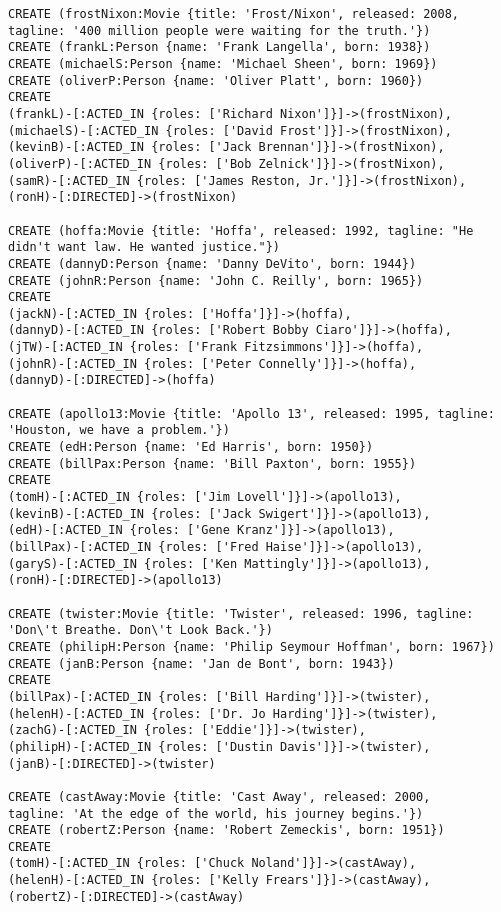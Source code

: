\begin{lstlisting}
CREATE (frostNixon:Movie {title: 'Frost/Nixon', released: 2008,
tagline: '400 million people were waiting for the truth.'})
CREATE (frankL:Person {name: 'Frank Langella', born: 1938})
CREATE (michaelS:Person {name: 'Michael Sheen', born: 1969})
CREATE (oliverP:Person {name: 'Oliver Platt', born: 1960})
CREATE
(frankL)-[:ACTED_IN {roles: ['Richard Nixon']}]->(frostNixon),
(michaelS)-[:ACTED_IN {roles: ['David Frost']}]->(frostNixon),
(kevinB)-[:ACTED_IN {roles: ['Jack Brennan']}]->(frostNixon),
(oliverP)-[:ACTED_IN {roles: ['Bob Zelnick']}]->(frostNixon),
(samR)-[:ACTED_IN {roles: ['James Reston, Jr.']}]->(frostNixon),
(ronH)-[:DIRECTED]->(frostNixon)

CREATE (hoffa:Movie {title: 'Hoffa', released: 1992, tagline: "He didn't want law. He wanted justice."})
CREATE (dannyD:Person {name: 'Danny DeVito', born: 1944})
CREATE (johnR:Person {name: 'John C. Reilly', born: 1965})
CREATE
(jackN)-[:ACTED_IN {roles: ['Hoffa']}]->(hoffa),
(dannyD)-[:ACTED_IN {roles: ['Robert Bobby Ciaro']}]->(hoffa),
(jTW)-[:ACTED_IN {roles: ['Frank Fitzsimmons']}]->(hoffa),
(johnR)-[:ACTED_IN {roles: ['Peter Connelly']}]->(hoffa),
(dannyD)-[:DIRECTED]->(hoffa)

CREATE (apollo13:Movie {title: 'Apollo 13', released: 1995, tagline: 'Houston, we have a problem.'})
CREATE (edH:Person {name: 'Ed Harris', born: 1950})
CREATE (billPax:Person {name: 'Bill Paxton', born: 1955})
CREATE
(tomH)-[:ACTED_IN {roles: ['Jim Lovell']}]->(apollo13),
(kevinB)-[:ACTED_IN {roles: ['Jack Swigert']}]->(apollo13),
(edH)-[:ACTED_IN {roles: ['Gene Kranz']}]->(apollo13),
(billPax)-[:ACTED_IN {roles: ['Fred Haise']}]->(apollo13),
(garyS)-[:ACTED_IN {roles: ['Ken Mattingly']}]->(apollo13),
(ronH)-[:DIRECTED]->(apollo13)

CREATE (twister:Movie {title: 'Twister', released: 1996, tagline: 'Don\'t Breathe. Don\'t Look Back.'})
CREATE (philipH:Person {name: 'Philip Seymour Hoffman', born: 1967})
CREATE (janB:Person {name: 'Jan de Bont', born: 1943})
CREATE
(billPax)-[:ACTED_IN {roles: ['Bill Harding']}]->(twister),
(helenH)-[:ACTED_IN {roles: ['Dr. Jo Harding']}]->(twister),
(zachG)-[:ACTED_IN {roles: ['Eddie']}]->(twister),
(philipH)-[:ACTED_IN {roles: ['Dustin Davis']}]->(twister),
(janB)-[:DIRECTED]->(twister)

CREATE (castAway:Movie {title: 'Cast Away', released: 2000,
tagline: 'At the edge of the world, his journey begins.'})
CREATE (robertZ:Person {name: 'Robert Zemeckis', born: 1951})
CREATE
(tomH)-[:ACTED_IN {roles: ['Chuck Noland']}]->(castAway),
(helenH)-[:ACTED_IN {roles: ['Kelly Frears']}]->(castAway),
(robertZ)-[:DIRECTED]->(castAway)


\end{lstlisting}
